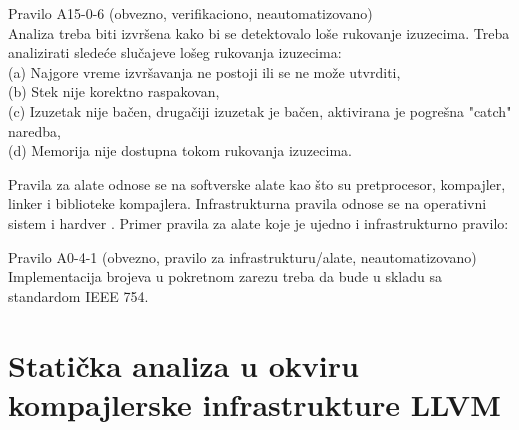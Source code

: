 \documentclass[12pt,oneside]{memoir}
\begin{document}
\begin{center}
\begin{tcolorbox}
Pravilo A15-0-6 (obvezno, verifikaciono, neautomatizovano) \\
Analiza treba biti izvršena kako bi se detektovalo loše rukovanje izuzecima. Treba analizirati slede\'ce slučajeve lošeg rukovanja izuzecima: \\
(a) Najgore vreme izvršavanja ne postoji ili se ne može utvrditi, \\
(b) Stek nije korektno raspakovan, \\
(c) Izuzetak nije bačen, drugačiji izuzetak je bačen, aktivirana je pogre\v{s}na "catch" naredba, \\
(d) Memorija nije dostupna tokom rukovanja izuzecima.
\end{tcolorbox}
\end{center}

Pravila za alate odnose se na softverske alate kao što su pretprocesor, kompajler, linker i biblioteke kompajlera.
Infrastrukturna pravila odnose se na operativni sistem i hardver \cite{AutosarGuidelines}.
Primer pravila za alate koje je ujedno i infrastrukturno pravilo:

\begin{center}
\begin{tcolorbox}
Pravilo A0-4-1 (obvezno, pravilo za infrastrukturu/alate, neautomatizovano) \\
Implementacija brojeva u pokretnom zarezu treba da bude u skladu sa standardom IEEE 754.
\end{tcolorbox}
\end{center}


\chapter{Stati\v{c}ka analiza u okviru kompajlerske infrastrukture LLVM}
\label{chp:llvm}
\end{document}
